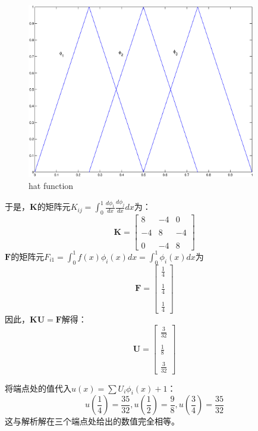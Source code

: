 \documentclass[paper=a4, fontsize=11pt]{scrartcl} %
\numberwithin{equation}{section} %
\numberwithin{figure}{section} %
\numberwithin{table}{section} %
\begin{document}
\begin{CJK*}{UTF8}{gbsn}
\begin{figure}[H]
\centering
\includegraphics[width=100mm]{figure-2-1-1.eps}
\caption{hat function}
\label{fig:test}
\end{figure}

于是，$\mathbf{K}$的矩阵元$K_{ij}=\int_0^1 \frac{d \phi_1}{dx} \frac{d\phi_j}{dx}dx$为：
\begin{equation}
\mathbf{K} = \begin{bmatrix}
8 & -4 & 0 \\\\
-4 & 8 & -4 \\\\
0 & -4 & 8 
\end{bmatrix}
\end{equation}
$\mathbf{F}$的矩阵元$F_{i1} = \int_0^1 f(x) \phi_i(x)dx = \int_0^1 \phi_i(x)dx$为
\begin{equation}
\mathbf{F} = \begin{bmatrix}
\frac{1}{4}\\\\
\frac{1}{4}\\\\
\frac{1}{4}
\end{bmatrix}
\end{equation}
因此，$\mathbf{KU}=\mathbf{F}$解得：
\begin{equation}
\mathbf{U} = \begin{bmatrix}
\frac{3}{32} \\\\
\frac{1}{8} \\\\
\frac{3}{32}
\end{bmatrix}
\end{equation}

将端点处的值代入$u(x) = \sum U_i \phi_i(x) + 1$：
\begin{equation}
u(\frac{1}{4}) = \frac{35}{32}, u(\frac{1}{2}) = \frac{9}{8}, u(\frac{3}{4}) = \frac{35}{32}
\end{equation}
这与解析解在三个端点处给出的数值完全相等。
\end{CJK*}
\end{document}
